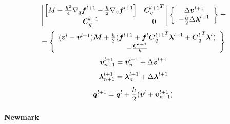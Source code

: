 \[
    \begin{bmatrix}\left[ M-\frac{h^2}{4}\nabla_q{\boldsymbol{f}}^{l+1}-\frac{h}{2}\nabla_v{\boldsymbol{f}}^{l+1} \right] 
    & {{\boldsymbol{C}}_q^{l+1}}^T \\ {\boldsymbol{C}}_q^{l+1} & 0 \end{bmatrix} 
    \left\{\begin{array}{c} \Delta{\boldsymbol{v}}^{l+1} \\ -\frac{h}{2}\Delta{\boldsymbol{\lambda}}^{l+1} \end{array}\right\}=\] 
    \begin{equation} \label{eq:eulfor_NRiter1} =
    \left\{\begin{array}{c} ({\boldsymbol{v}}^l-{\boldsymbol{v}}^{l+1}){\boldsymbol{M}}+\frac{h}{2}({\boldsymbol{f}}^{l+1} + {\boldsymbol{f}}^l {{\boldsymbol{C}}_q^{l+1}}^T {\boldsymbol{\lambda}}^{l+1} + {{\boldsymbol{C}}_q^l}^T {\boldsymbol{\lambda}}^l)\\ -\frac{{\boldsymbol{C^{l+1}}}}{h} \end{array} \right\}
\end{equation}
\begin{equation}
        {\boldsymbol{v}}_{n+1}^{l+1} = {\boldsymbol{v}}_n^{l+1} + \Delta{\boldsymbol{v}}^{l+1}
\end{equation}
\begin{equation}
        {\boldsymbol{\lambda}}_{n+1}^{l+1} = {\boldsymbol{\lambda}}_n^{l+1} + \Delta{\boldsymbol{\lambda}}^{l+1}
\end{equation}
\begin{equation} \label{eq:eulfor_NRiter4}
        {\boldsymbol{q}}^{l+1} = {\boldsymbol{q}}^l + \frac{h}{2}({\boldsymbol{v}}^l+{\boldsymbol{v}}_{n+1}^{l+1})
\end{equation}

\paragraph{Newmark}

